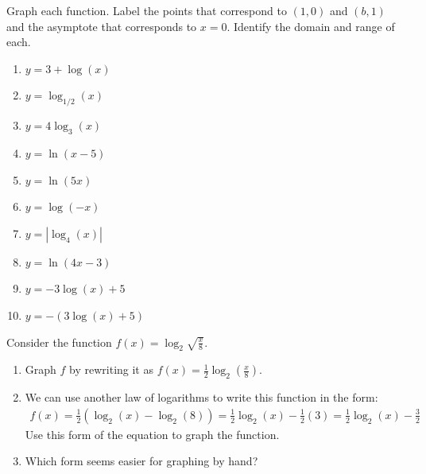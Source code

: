 \documentclass[10pt,]{book}
\theoremstyle{ptxdefinitionnotitle}
\theoremstyle{ptxdefinitiontitle}
\theoremstyle{ptxdefinitionnotitle}
\theoremstyle{ptxdefinitiontitle}
\theoremstyle{ptxdefinitionnotitle}
\theoremstyle{ptxdefinitiontitle}
\numberwithin{equation}{section}
\begin{document}
\begin{divisionexercise}{7}\hypertarget{exercise-97}{}
\hypertarget{p-363}{}%
Graph each function.  Label the points that correspond to \(\left( 1,0 \right)\) and \(\left( b,1 \right)\) and the asymptote that corresponds to \(x = 0\). Identify the domain and range of each. \leavevmode%
\begin{enumerate}[label=(\alph*)]
\item\hypertarget{li-259}{}\(y = 3 + \log \left( x \right)\)%
\item\hypertarget{li-260}{}\(y = \log_{1/2} \left( x \right)\)%
\item\hypertarget{li-261}{}\(y = 4 \log_3 \left( x \right)\)%
\item\hypertarget{li-262}{}\(y = \ln \left( x - 5 \right)\)%
\item\hypertarget{li-263}{}\(y = \ln \left( 5x \right)\)%
\item\hypertarget{li-264}{}\(y = \log \left( -x \right)\)%
\item\hypertarget{li-265}{}\(y = \left| \log_4 \left( x \right) \right|\)%
\item\hypertarget{li-266}{}\(y = \ln \left( 4x - 3 \right)\)%
\item\hypertarget{li-267}{}\(y = -3 \log\left( x \right) + 5\)%
\item\hypertarget{li-268}{}\(y = - \left( 3 \log \left( x \right) + 5 \right)\)%
\end{enumerate}
%
\end{divisionexercise}%
\begin{divisionexercise}{8}\hypertarget{exercise-98}{}
\hypertarget{p-364}{}%
Consider the function \(f(x) = \log_2 \sqrt{ \frac{x}{8} }\). \leavevmode%
\begin{enumerate}[label=(\alph*)]
\item\hypertarget{li-269}{}Graph \(f\) by rewriting it as \(f(x) = \frac{1}{2} \log_2 \left( \frac{x}{8} \right)\).%
\item\hypertarget{li-270}{}We can use another law of logarithms to write this function in the form:%
\begin{gather*}
f(x) = \frac{1}{2} \left( \log_2 \left( x \right) - \log_2 \left( 8 \right) \right) = \frac{1}{2} \log_2 \left(x \right) - \frac{1}{2} \left( 3 \right) = \frac{1}{2} \log_2 \left( x \right) - \frac{3}{2}
\end{gather*}
Use this form of the equation to graph the function.%
\item\hypertarget{li-271}{}Which form seems easier for graphing by hand?%
\end{enumerate}
%
\end{divisionexercise}%
\end{document}
